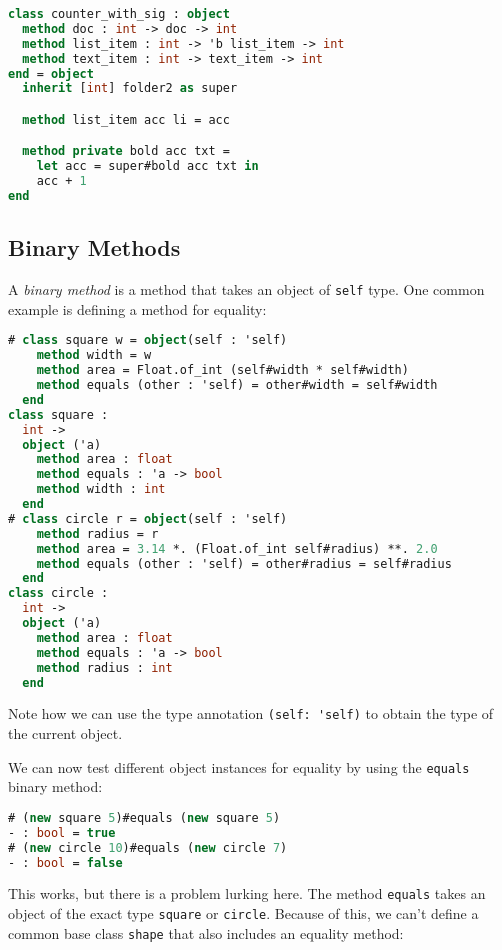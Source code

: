 \begin{lstlisting}[language=Caml]
class counter_with_sig : object
  method doc : int -> doc -> int
  method list_item : int -> 'b list_item -> int
  method text_item : int -> text_item -> int
end = object
  inherit [int] folder2 as super

  method list_item acc li = acc

  method private bold acc txt =
    let acc = super#bold acc txt in
    acc + 1
end
\end{lstlisting}

\hypertarget{binary-methods}{%
\subsection{Binary Methods}\label{binary-methods}}

A \emph{binary method} is a method that takes an object of
\passthrough{\lstinline!self!} type. One common example is defining a
method for equality: 

\begin{lstlisting}[language=Caml]
# class square w = object(self : 'self)
    method width = w
    method area = Float.of_int (self#width * self#width)
    method equals (other : 'self) = other#width = self#width
  end
class square :
  int ->
  object ('a)
    method area : float
    method equals : 'a -> bool
    method width : int
  end
# class circle r = object(self : 'self)
    method radius = r
    method area = 3.14 *. (Float.of_int self#radius) **. 2.0
    method equals (other : 'self) = other#radius = self#radius
  end
class circle :
  int ->
  object ('a)
    method area : float
    method equals : 'a -> bool
    method radius : int
  end
\end{lstlisting}

Note how we can use the type annotation
\passthrough{\lstinline!(self: 'self)!} to obtain the type of the
current object.

We can now test different object instances for equality by using the
\passthrough{\lstinline!equals!} binary method:

\begin{lstlisting}[language=Caml]
# (new square 5)#equals (new square 5)
- : bool = true
# (new circle 10)#equals (new circle 7)
- : bool = false
\end{lstlisting}

This works, but there is a problem lurking here. The method
\passthrough{\lstinline!equals!} takes an object of the exact type
\passthrough{\lstinline!square!} or \passthrough{\lstinline!circle!}.
Because of this, we can't define a common base class
\passthrough{\lstinline!shape!} that also includes an equality method:

